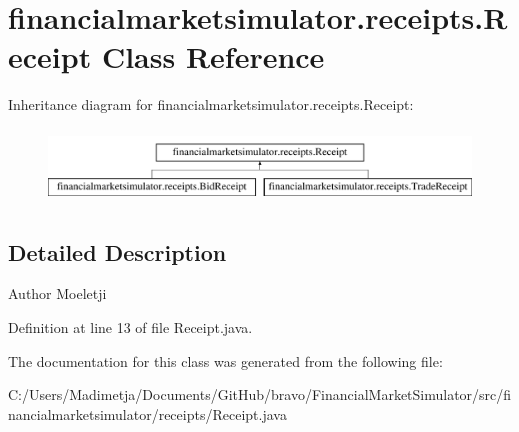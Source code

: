 \hypertarget{classfinancialmarketsimulator_1_1receipts_1_1_receipt}{\section{financialmarketsimulator.\+receipts.\+Receipt Class Reference}
\label{classfinancialmarketsimulator_1_1receipts_1_1_receipt}
}
Inheritance diagram for financialmarketsimulator.\+receipts.\+Receipt\+:\begin{figure}[H]
\begin{center}
\leavevmode
\includegraphics[height=1.978799cm]{classfinancialmarketsimulator_1_1receipts_1_1_receipt}
\end{center}
\end{figure}


\subsection{Detailed Description}
\begin{DoxyAuthor}{Author}
Moeletji 
\end{DoxyAuthor}


Definition at line 13 of file Receipt.\+java.



The documentation for this class was generated from the following file\+:\begin{DoxyCompactItemize}
\item 
C\+:/\+Users/\+Madimetja/\+Documents/\+Git\+Hub/bravo/\+Financial\+Market\+Simulator/src/financialmarketsimulator/receipts/Receipt.\+java\end{DoxyCompactItemize}
